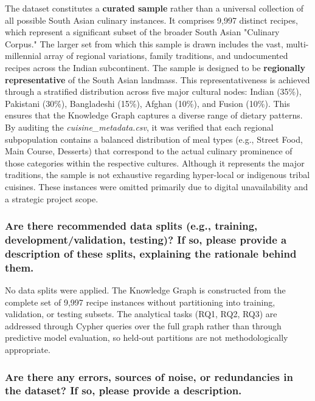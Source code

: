 \documentclass{article}
\newcommand{\question}[1]{#1}
\begin{document}
The dataset constitutes a \textbf{curated sample} rather than a universal collection of all possible South Asian culinary instances. It comprises 9,997 distinct recipes, which represent a significant subset of the broader South Asian "Culinary Corpus." The larger set from which this sample is drawn includes the vast, multi-millennial array of regional variations, family traditions, and undocumented recipes across the Indian subcontinent. The sample is designed to be \textbf{regionally representative} of the South Asian landmass. This representativeness is achieved through a stratified distribution across five major cultural nodes: Indian (35\%), Pakistani (30\%), Bangladeshi (15\%), Afghan (10\%), and Fusion (10\%). This ensures that the Knowledge Graph captures a diverse range of dietary patterns.
\\
 \newline By auditing the \textit{cuisine\_metadata.csv}, it was verified that each regional subpopulation contains a balanced distribution of meal types (e.g., Street Food, Main Course, Desserts) that correspond to the actual culinary prominence of those categories within the respective cultures. Although it represents the major traditions, the sample is not exhaustive regarding hyper-local or indigenous tribal cuisines. These instances were omitted primarily due to digital unavailability and a strategic project scope.

\question{\subsubsection*{Are there recommended data splits (e.g., training, development/validation, testing)? If so, please provide a description of these splits, explaining the rationale behind them.}}

No data splits were applied. The Knowledge Graph is constructed from the complete set of 9,997 recipe instances without partitioning into training, validation, or testing subsets. The analytical tasks (RQ1, RQ2, RQ3) are addressed through Cypher queries over the full graph rather than through predictive model evaluation, so held-out partitions are not methodologically appropriate.


\question{\subsubsection*{Are there any errors, sources of noise, or redundancies in the dataset? If so, please provide a description.}}
\end{document}
